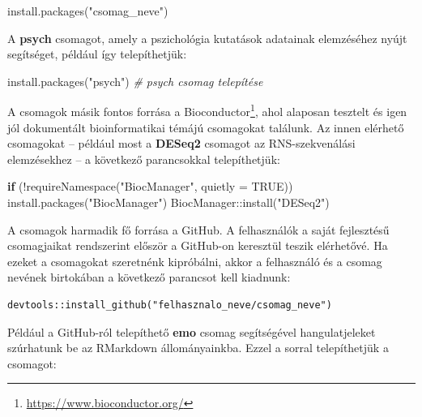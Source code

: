 \documentclass[
]{book}
\newenvironment{Shaded}{\begin{snugshade}}{\end{snugshade}}
\newcommand{\AttributeTok}[1]{\textcolor[rgb]{0.77,0.63,0.00}{#1}}
\newcommand{\CommentTok}[1]{\textcolor[rgb]{0.56,0.35,0.01}{\textit{#1}}}
\newcommand{\ConstantTok}[1]{\textcolor[rgb]{0.00,0.00,0.00}{#1}}
\newcommand{\ControlFlowTok}[1]{\textcolor[rgb]{0.13,0.29,0.53}{\textbf{#1}}}
\newcommand{\FunctionTok}[1]{\textcolor[rgb]{0.00,0.00,0.00}{#1}}
\newcommand{\NormalTok}[1]{#1}
\newcommand{\SpecialCharTok}[1]{\textcolor[rgb]{0.00,0.00,0.00}{#1}}
\newcommand{\StringTok}[1]{\textcolor[rgb]{0.31,0.60,0.02}{#1}}
\DeclareRobustCommand{\href}[2]{#2\footnote{\url{#1}}}
\renewcommand{\href}[2]{#2\footnote{\url{#1}}}
\begin{document}
\begin{Shaded}
\begin{Highlighting}[]
\NormalTok{install.packages("csomag\_neve")}
\end{Highlighting}
\end{Shaded}

A \textbf{psych} csomagot, amely a pszichológia kutatások adatainak elemzéséhez nyújt segítséget, például így telepíthetjük:

\begin{Shaded}
\begin{Highlighting}[]
\FunctionTok{install.packages}\NormalTok{(}\StringTok{"psych"}\NormalTok{)        }\CommentTok{\# psych csomag telepítése}
\end{Highlighting}
\end{Shaded}

A csomagok másik fontos forrása a \href{https://www.bioconductor.org/}{Bioconductor}, ahol alaposan tesztelt és igen jól dokumentált bioinformatikai témájú csomagokat találunk. Az innen elérhető csomagokat -- például most a \textbf{DESeq2} csomagot az RNS-szekvenálási elemzésekhez -- a következő parancsokkal telepíthetjük:

\begin{Shaded}
\begin{Highlighting}[]
\ControlFlowTok{if}\NormalTok{ (}\SpecialCharTok{!}\FunctionTok{requireNamespace}\NormalTok{(}\StringTok{"BiocManager"}\NormalTok{, }\AttributeTok{quietly =} \ConstantTok{TRUE}\NormalTok{))}
    \FunctionTok{install.packages}\NormalTok{(}\StringTok{"BiocManager"}\NormalTok{)}
\NormalTok{BiocManager}\SpecialCharTok{::}\FunctionTok{install}\NormalTok{(}\StringTok{"DESeq2"}\NormalTok{)}
\end{Highlighting}
\end{Shaded}

A csomagok harmadik fő forrása a GitHub. A felhasználók a saját fejlesztésű csomagjaikat rendszerint először a GitHub-on keresztül teszik elérhetővé. Ha ezeket a csomagokat szeretnénk kipróbálni, akkor a felhasználó és a csomag nevének birtokában a következő parancsot kell kiadnunk:

\begin{verbatim}
devtools::install_github("felhasznalo_neve/csomag_neve")
\end{verbatim}

Például a GitHub-ról telepíthető \textbf{emo} csomag segítségével hangulatjeleket szúrhatunk be az RMarkdown állományainkba. Ezzel a sorral telepíthetjük a csomagot:
\end{document}
